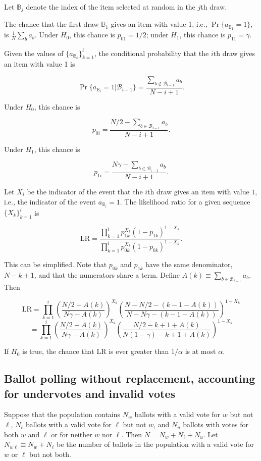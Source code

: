 \documentclass[12pt]{article}
\begin{document}
Let $\mathbb B_j$ denote the index of the item selected at random in the $j$th draw.

The chance that the first draw ${\mathbb B_1}$ gives an item with value 1, i.e., 
$\Pr \{a_{\mathbb B_1} = 1\}$, is $\frac{1}{N}\sum_b a_b$.
Under $H_0$, this chance is $p_{01} = 1/2$; under $H_1$, this chance is 
$p_{11} = \gamma$.

Given the values of $\{a_{\mathbb B_k}\}_{k=1}^i$, the conditional
probability that the $i$th draw gives an item with value 1 is

$$
   \Pr \{a_{\mathbb B_i} = 1 | {\mathcal B_{i-1}} \} = \frac{ \sum_{b \notin {\mathcal B_{i-1}}} a_b}{N-i+1}.
$$

Under $H_0$, this chance is

$$
   p_{0i} =  \frac{N/2 - \sum_{b \in {\mathcal B_{i-1}}} a_b}{N - i + 1}.
$$

Under $H_1$, this chance is

$$
   p_{1i} = \frac{N \gamma - \sum_{b \in {\mathcal B_{i-1}}} a_b}{N - i+1}.
$$

Let $X_i$ be the indicator of the event that the $i$th draw gives an item with
value $1$, i.e., the indicator of the event $a_{\mathbb B_i} = 1$.
The likelihood ratio for a given sequence $\{X_k\}_{k=1}^i$ is

$$
    \mbox{LR} = \frac{\prod_{k=1}^i p_{1k}^{X_k}(1-p_{1k})^{1-X_k}}
         {\prod_{k=1}^i p_{0k}^{X_k}(1-p_{0k})^{1-X_k}}.
$$

This can be simplified. 
Note that $p_{0k}$ and $p_{1k}$ have the same denominator,
$N - k + 1$, and that the numerators share a term.
Define $A(k) \equiv \sum_{b \in {\mathcal B_{i-1}}} a_b$.
Then

$$
    \mbox{LR} = \prod_{k=1}^i 
    \left ( \frac{N/2 - A(k)}{N\gamma - A(k)} \right )^{X_k}
    \left ( \frac{N-N/2 - (k-1-A(k))}{N-N\gamma - (k - 1 - A(k))} \right )^{1-X_k}
$$
$$
   = \prod_{k=1}^i  \left ( \frac{N/2 - A(k)}{N\gamma - A(k)} \right )^{X_k}
    \left ( \frac{N/2 - k + 1 + A(k)}{N(1-\gamma) - k + 1 + A(k)} \right )^{1-X_k}
$$

If $H_0$ is true, the chance that $\mbox{LR}$ is ever greater than $1/\alpha$
is at most $\alpha$.

\subsection{Ballot polling without replacement, accounting for undervotes and invalid votes}
Suppose that the population contains $N_w$ ballots with a valid vote for $w$ but not $\ell$,
$N_\ell$ ballots with a valid vote for $\ell$ but not $w$, and $N_u$ ballots with votes for both
$w$ and $\ell$ or for neither $w$ nor $\ell$.
Then $N = N_w + N_\ell + N_u$.
Let $N_{w\ell} \equiv N_w + N_\ell$ be the number of ballots in the 
population with a valid vote for $w$ or $\ell$ but not both.
\end{document}
